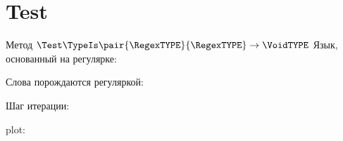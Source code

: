 \section{Test}
\begin{frame}[fragile]{Метод $\Test\TypeIs\pair{\RegexTYPE}{\RegexTYPE}\to\VoidTYPE$}
    Язык, основанный на регулярке:


    Слова порождаются регуляркой:

    Шаг итерации:


	plot:


\end{frame}

